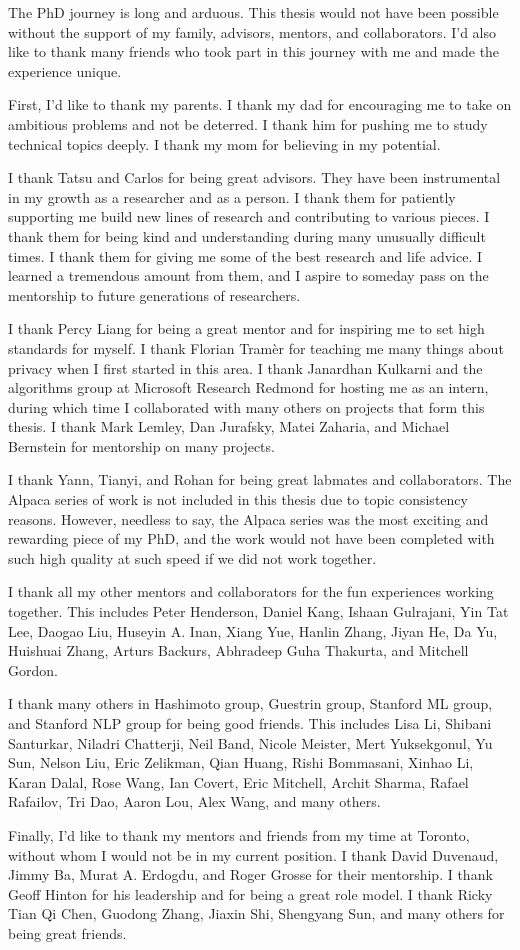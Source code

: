 
The PhD journey is long and arduous. 
This thesis would not have been possible without the support of my family, advisors, mentors, and collaborators.
I'd also like to thank many friends who took part in this journey with me and made the experience unique.

First, I'd like to thank my parents.
I thank my dad for encouraging me to take on ambitious problems and not be deterred.
I thank him for pushing me to study technical topics deeply.
I thank my mom for believing in my potential.

I thank Tatsu and Carlos for being great advisors.
They have been instrumental in my growth as a researcher and as a person.
I thank them for patiently supporting me build new lines of research and contributing to various pieces.
I thank them for being kind and understanding during many unusually difficult times.
I thank them for giving me some of the best research and life advice.
I learned a tremendous amount from them, and I aspire to someday pass on the mentorship to future generations of researchers.

I thank Percy Liang for being a great mentor and for inspiring me to set high standards for myself.
I thank Florian Tramèr for teaching me many things about privacy when I first started in this area.
I thank Janardhan Kulkarni and the algorithms group at Microsoft Research Redmond for hosting me as an intern, during which time I collaborated with many others on projects that form this thesis.
I thank Mark Lemley, Dan Jurafsky, Matei Zaharia, and Michael Bernstein for mentorship on many projects.

I thank Yann, Tianyi, and Rohan for being great labmates and collaborators.
The Alpaca series of work is not included in this thesis due to topic consistency reasons. 
However, needless to say, the Alpaca series was the most exciting and rewarding piece of my PhD, and the work would not have been completed with such high quality at such speed if we did not work together.

I thank all my other mentors and collaborators for the fun experiences working together. 
This includes Peter Henderson, Daniel Kang, Ishaan Gulrajani, Yin Tat Lee, Daogao Liu, Huseyin A. Inan, Xiang Yue, Hanlin Zhang, Jiyan He, Da Yu, Huishuai Zhang, Arturs Backurs, Abhradeep Guha Thakurta, and Mitchell Gordon.

I thank many others in Hashimoto group, Guestrin group, Stanford ML group, and Stanford NLP group for being good friends. 
This includes Lisa Li, Shibani Santurkar, Niladri Chatterji, Neil Band, Nicole Meister, Mert Yuksekgonul, Yu Sun, Nelson Liu, Eric Zelikman, Qian Huang, Rishi Bommasani, Xinhao Li, Karan Dalal, Rose Wang, Ian Covert, Eric Mitchell, Archit Sharma, Rafael Rafailov, Tri Dao, Aaron Lou, Alex Wang, and many others.

Finally, I'd like to thank my mentors and friends from my time at Toronto, without whom I would not be in my current position.
I thank David Duvenaud, Jimmy Ba, Murat A. Erdogdu, and Roger Grosse for their mentorship. 
I thank Geoff Hinton for his leadership and for being a great role model.
I thank Ricky Tian Qi Chen, Guodong Zhang, Jiaxin Shi, Shengyang Sun, and many others for being great friends.